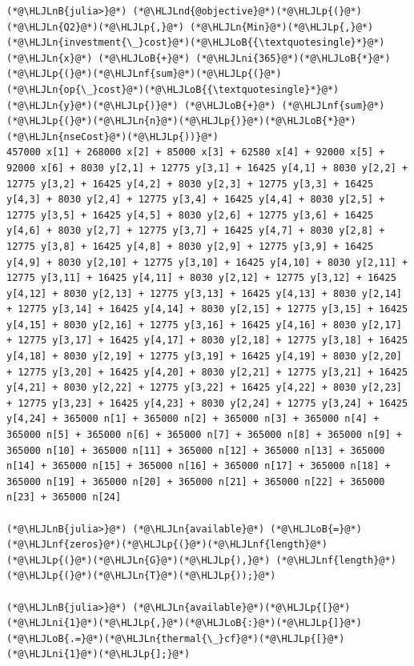 \documentclass[12pt,a4paper]{article}
\newcommand{\HLJLn}[1]{#1}
\newcommand{\HLJLnd}[1]{\textcolor[RGB]{214,102,97}{#1}}
\newcommand{\HLJLnf}[1]{\textcolor[RGB]{66,102,213}{#1}}
\newcommand{\HLJLnB}[1]{\textcolor[RGB]{59,151,46}{#1}}
\newcommand{\HLJLni}[1]{\textcolor[RGB]{59,151,46}{#1}}
\newcommand{\HLJLoB}[1]{\textcolor[RGB]{102,102,102}{\textbf{#1}}}
\newcommand{\HLJLp}[1]{#1}
\begin{document}
\begin{lstlisting}
(*@\HLJLnB{julia>}@*) (*@\HLJLnd{@objective}@*)(*@\HLJLp{(}@*)(*@\HLJLn{Q2}@*)(*@\HLJLp{,}@*) (*@\HLJLn{Min}@*)(*@\HLJLp{,}@*) (*@\HLJLn{investment{\_}cost}@*)(*@\HLJLoB{{\textquotesingle}*}@*) (*@\HLJLn{x}@*) (*@\HLJLoB{+}@*) (*@\HLJLni{365}@*)(*@\HLJLoB{*}@*)(*@\HLJLp{(}@*)(*@\HLJLnf{sum}@*)(*@\HLJLp{(}@*)(*@\HLJLn{op{\_}cost}@*)(*@\HLJLoB{{\textquotesingle}*}@*)(*@\HLJLn{y}@*)(*@\HLJLp{)}@*) (*@\HLJLoB{+}@*) (*@\HLJLnf{sum}@*)(*@\HLJLp{(}@*)(*@\HLJLn{n}@*)(*@\HLJLp{)}@*)(*@\HLJLoB{*}@*)(*@\HLJLn{nseCost}@*)(*@\HLJLp{))}@*)
457000 x[1] + 268000 x[2] + 85000 x[3] + 62580 x[4] + 92000 x[5] + 92000 x[6] + 8030 y[2,1] + 12775 y[3,1] + 16425 y[4,1] + 8030 y[2,2] + 12775 y[3,2] + 16425 y[4,2] + 8030 y[2,3] + 12775 y[3,3] + 16425 y[4,3] + 8030 y[2,4] + 12775 y[3,4] + 16425 y[4,4] + 8030 y[2,5] + 12775 y[3,5] + 16425 y[4,5] + 8030 y[2,6] + 12775 y[3,6] + 16425 y[4,6] + 8030 y[2,7] + 12775 y[3,7] + 16425 y[4,7] + 8030 y[2,8] + 12775 y[3,8] + 16425 y[4,8] + 8030 y[2,9] + 12775 y[3,9] + 16425 y[4,9] + 8030 y[2,10] + 12775 y[3,10] + 16425 y[4,10] + 8030 y[2,11] + 12775 y[3,11] + 16425 y[4,11] + 8030 y[2,12] + 12775 y[3,12] + 16425 y[4,12] + 8030 y[2,13] + 12775 y[3,13] + 16425 y[4,13] + 8030 y[2,14] + 12775 y[3,14] + 16425 y[4,14] + 8030 y[2,15] + 12775 y[3,15] + 16425 y[4,15] + 8030 y[2,16] + 12775 y[3,16] + 16425 y[4,16] + 8030 y[2,17] + 12775 y[3,17] + 16425 y[4,17] + 8030 y[2,18] + 12775 y[3,18] + 16425 y[4,18] + 8030 y[2,19] + 12775 y[3,19] + 16425 y[4,19] + 8030 y[2,20] + 12775 y[3,20] + 16425 y[4,20] + 8030 y[2,21] + 12775 y[3,21] + 16425 y[4,21] + 8030 y[2,22] + 12775 y[3,22] + 16425 y[4,22] + 8030 y[2,23] + 12775 y[3,23] + 16425 y[4,23] + 8030 y[2,24] + 12775 y[3,24] + 16425 y[4,24] + 365000 n[1] + 365000 n[2] + 365000 n[3] + 365000 n[4] + 365000 n[5] + 365000 n[6] + 365000 n[7] + 365000 n[8] + 365000 n[9] + 365000 n[10] + 365000 n[11] + 365000 n[12] + 365000 n[13] + 365000 n[14] + 365000 n[15] + 365000 n[16] + 365000 n[17] + 365000 n[18] + 365000 n[19] + 365000 n[20] + 365000 n[21] + 365000 n[22] + 365000 n[23] + 365000 n[24]

(*@\HLJLnB{julia>}@*) (*@\HLJLn{available}@*) (*@\HLJLoB{=}@*) (*@\HLJLnf{zeros}@*)(*@\HLJLp{(}@*)(*@\HLJLnf{length}@*)(*@\HLJLp{(}@*)(*@\HLJLn{G}@*)(*@\HLJLp{),}@*) (*@\HLJLnf{length}@*)(*@\HLJLp{(}@*)(*@\HLJLn{T}@*)(*@\HLJLp{));}@*)

(*@\HLJLnB{julia>}@*) (*@\HLJLn{available}@*)(*@\HLJLp{[}@*)(*@\HLJLni{1}@*)(*@\HLJLp{,}@*)(*@\HLJLoB{:}@*)(*@\HLJLp{]}@*) (*@\HLJLoB{.=}@*)(*@\HLJLn{thermal{\_}cf}@*)(*@\HLJLp{[}@*)(*@\HLJLni{1}@*)(*@\HLJLp{];}@*)


\end{lstlisting}
\end{document}

